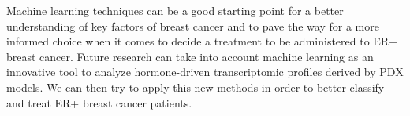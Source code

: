 \documentclass[10pt,conference,compsocconf]{IEEEtran}
\begin{document}
Machine learning techniques can be a good starting point for a better understanding of key factors of breast cancer and to pave the way for a more informed choice when it comes to decide a treatment to be administered to ER+ breast cancer. Future research can take into account machine learning as an innovative tool to analyze hormone-driven transcriptomic profiles derived by PDX models. We can then try to apply this new methods in order to better classify and treat ER+ breast cancer patients.



\end{document}
